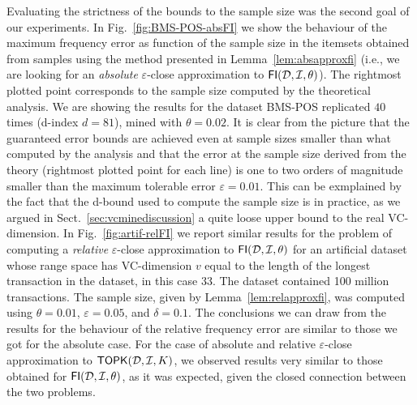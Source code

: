 Evaluating the strictness of the bounds to the sample size was the second goal
of our experiments. In Fig.~\ref{fig:BMS-POS-absFI} we show the behaviour of
the maximum frequency error as function of the sample size in the itemsets
obtained from samples using the method presented in Lemma~\ref{lem:absapproxfi}
(i.e., we are looking for an \emph{absolute} $\varepsilon$-close approximation
to $\mathsf{FI}({\cal D},{\cal I},\theta)$). The rightmost plotted point corresponds to the
sample size computed by the theoretical analysis. We are showing the results
for the dataset BMS-POS replicated $40$ times (d-index $d=81$), mined with
$\theta=0.02$. It is clear from the picture that the guaranteed error bounds are
achieved even at sample sizes smaller than what computed by the analysis and
that the error at the sample size derived from the theory (rightmost plotted
point for each line) is one to two orders of magnitude smaller than the maximum tolerable
error $\varepsilon=0.01$. This can be exmplained by the fact that the d-bound
used to compute the sample size is in practice, as we argued in
Sect.~\ref{sec:vcminediscussion} a quite loose upper bound to the real VC-dimension.
In Fig.~\ref{fig:artif-relFI}
we report similar results for the problem of computing a \emph{relative}
$\varepsilon$-close approximation to $\mathsf{FI}({\cal D},{\cal I},\theta)$ for an artificial
dataset whose range space has VC-dimension $v$ equal to the length of the
longest transaction in the dataset, in this case $33$. The dataset contained 100
million transactions. The sample size, given by Lemma~\ref{lem:relapproxfi},
was computed using $\theta=0.01$, $\varepsilon=0.05$, and $\delta=0.1$.
The conclusions we can draw from the results for the behaviour of the
relative frequency error are similar to those we got for the absolute case.
For the case of absolute and relative $\varepsilon$-close approximation to
$\mathsf{TOPK}({\cal D},{\cal I},K)$, we observed results very similar to those obtained for
$\mathsf{FI}({\cal D},{\cal I},\theta)$, as it was expected, given the closed connection between
the two problems. 

